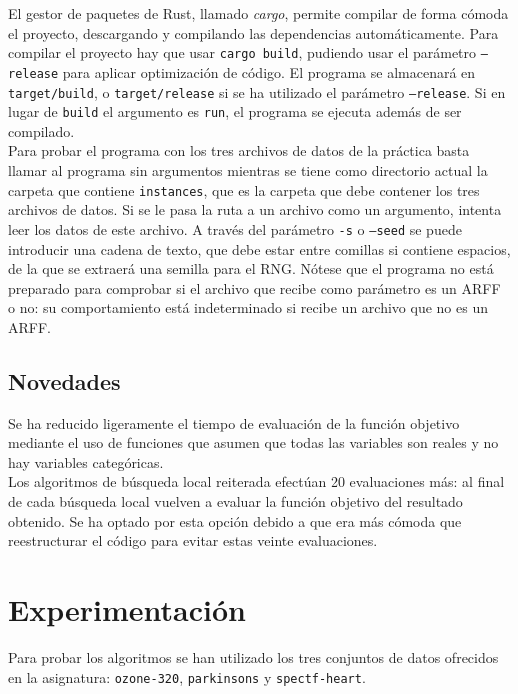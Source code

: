 \documentclass{article}
\begin{document}
El gestor de paquetes de Rust, llamado \textit{cargo}, permite compilar de forma cómoda el proyecto, descargando y compilando las dependencias automáticamente. Para compilar el proyecto hay que usar \texttt{cargo build}, pudiendo usar el parámetro \texttt{--release} para aplicar optimización de código. El programa se almacenará en \texttt{target/build}, o \texttt{target/release} si se ha utilizado el parámetro \texttt{--release}. Si en lugar de \texttt{build} el argumento es \texttt{run}, el programa se ejecuta además de ser compilado. \\

Para probar el programa con los tres archivos de datos de la práctica basta llamar al programa sin argumentos mientras se tiene como directorio actual la carpeta que contiene \texttt{instances}, que es la carpeta que debe contener los tres archivos de datos. Si se le pasa la ruta a un archivo como un argumento, intenta leer los datos de este archivo. A través del parámetro \texttt{-s} o \texttt{--seed} se puede introducir una cadena de texto, que debe estar entre comillas si contiene espacios, de la que se extraerá una semilla para el RNG. Nótese que el programa no está preparado para comprobar si el archivo que recibe como parámetro es un ARFF o no: su comportamiento está indeterminado si recibe un archivo que no es un ARFF.

\subsection*{Novedades}

Se ha reducido ligeramente el tiempo de evaluación de la función objetivo mediante el uso de funciones que asumen que todas las variables son reales y no hay variables categóricas. \\

Los algoritmos de búsqueda local reiterada efectúan 20 evaluaciones más: al final de cada búsqueda local vuelven a evaluar la función objetivo del resultado obtenido. Se ha optado por esta opción debido a que era más cómoda que reestructurar el código para evitar estas veinte evaluaciones.

\section{Experimentación}

Para probar los algoritmos se han utilizado los tres conjuntos de datos ofrecidos en la asignatura: \texttt{ozone-320}, \texttt{parkinsons} y \texttt{spectf-heart}. \\
\end{document}
